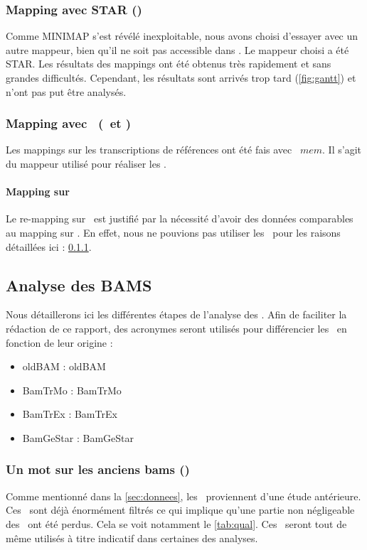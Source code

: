 \documentclass[../main]{subfiles} %
\begin{document}
\subsubsection{Mapping avec \gls{STAR} (\GeMo)}
\label{sec:Star}
Comme \gls{MINIMAP} s’est révélé inexploitable, nous avons choisi d’essayer avec un autre \gls{mappeur}, bien qu’il ne soit pas accessible dans \GeCKO. Le \gls{mappeur} choisi a été \gls{STAR}. Les résultats des \glspl{mapping} ont été obtenus très rapidement et sans grandes difficultés. Cependant, les résultats sont arrivés trop tard (\cref{fig:gantt}) et n'ont pas put être analysés. 



\subsubsection{Mapping avec \BWA (\TrEx et \TrMo)}
Les mappings sur les transcriptions de références ont été fais avec \BWA $mem$. Il s’agit du \gls{mappeur} utilisé pour réaliser les \OldBam.

\paragraph{Mapping sur \TrEx} Le re-mapping sur \TrEx est justifié par la nécessité d'avoir des données comparables au \gls{mapping} sur \TrMo. En effet, nous ne pouvions pas utiliser les \OldBam pour les raisons détaillées ici : \ref{sec:oldBam}. 




\subsection{Analyse des BAMS}
Nous détaillerons ici les différentes étapes de l'analyse des \bam.
Afin de faciliter la rédaction de ce rapport, des acronymes seront utilisés pour différencier les \bam en fonction de leur origine :
\begin{itemize}
    \item \acrshort{oldBAM} : \acrlong{oldBAM}
    \item \acrshort{BamTrMo} : \acrlong{BamTrMo}
    \item \acrshort{BamTrEx} : \acrlong{BamTrEx}
    \item \acrshort{BamGeStar} : \acrlong{BamGeStar}
\end{itemize}



\subsubsection{Un mot sur les anciens bams (\OldBam)}
\label{sec:oldBam}
Comme mentionné dans la \cref{sec:donnees}, les \OldBam proviennent d'une étude antérieure. Ces \bam sont déjà énormément filtrés ce qui implique qu'une partie non négligeable des \reads ont été perdus. Cela se voit notamment le \cref{tab:qual}. Ces \bam seront tout de même utilisés à titre indicatif dans certaines des analyses.
\end{document}
